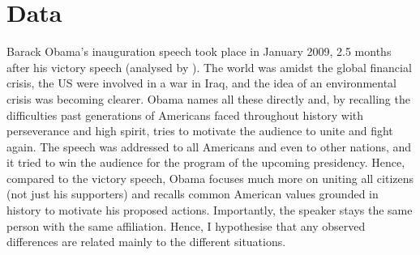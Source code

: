 \documentclass[11pt]{article}
\begin{document}
\section{Data}{
	Barack Obama's inauguration speech took place in January 2009, 2.5 months after his victory speech (analysed by \citeauthor{Ye}).
	The world was amidst the global financial crisis, the US were involved in a war in Iraq, and the idea of an environmental crisis was becoming clearer.
	Obama names all these directly and, by recalling the difficulties past generations of Americans faced throughout history with perseverance and high spirit, 
	tries to motivate the audience to unite and fight again.
	The speech was addressed to all Americans and even to other nations, and it tried to win the audience for the program of the upcoming presidency.
	Hence, compared to the victory speech, Obama focuses much more on uniting all citizens (not just his supporters) and recalls common American values grounded in history to motivate his proposed actions. 
	Importantly, the speaker stays the same person with the same affiliation. Hence, I hypothesise that any observed differences are related mainly to the different situations.

}
\end{document}
